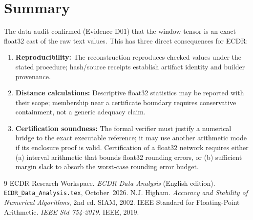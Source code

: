 \documentclass[11pt, a4paper]{article}
\theoremstyle{definition}
\theoremstyle{plain}
\newcommand{\code}[1]{{\small\ttfamily\nolinkurl{#1}}}
\begin{document}
\section{Summary}

The data audit confirmed (Evidence D01) that the window tensor is an exact float32
cast of the raw text values. This has three direct consequences for ECDR:
\begin{enumerate}[leftmargin=1.5em]
  \item \textbf{Reproducibility:} The reconstruction reproduces checked values under the stated procedure; hash/source receipts establish artifact identity and builder provenance.
  \item \textbf{Distance calculations:} Descriptive float32 statistics may be reported with their scope; membership near a certificate boundary requires conservative containment, not a generic adequacy claim.
  \item \textbf{Certification soundness:} The formal verifier must justify a numerical bridge to the exact executable reference; it may use another arithmetic mode if its enclosure proof is valid. Certification of a float32
        network requires either (a) interval arithmetic that bounds float32 rounding
        errors, or (b) sufficient margin slack to absorb the worst-case rounding
        error budget.
\end{enumerate}

\begin{thebibliography}{9}
  ECDR Research Workspace. \textit{ECDR Data Analysis} (English edition).
  \code{ECDR_Data_Analysis.tex}, October~2026.
  N.J. Higham. \textit{Accuracy and Stability of Numerical Algorithms}, 2nd ed.
  SIAM, 2002.
  IEEE Standard for Floating-Point Arithmetic. \textit{IEEE Std 754-2019}.
  IEEE, 2019.
\end{thebibliography}
\end{document}
